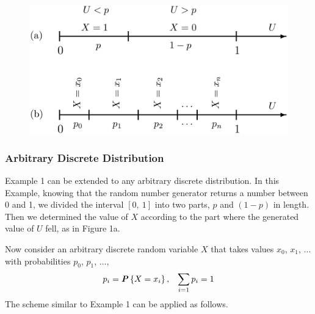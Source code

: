 \begin{figure}[H]
  \centering
  \includegraphics[width=\linewidth]{img/fig-5.2.png}
  \caption{}
\end{figure}

\subsubsection{Arbitrary Discrete Distribution}

Example 1 can be extended to any arbitrary discrete distribution. In this Example, knowing that the random number generator returns a number between 0 and 1, we divided the interval $\left[ 0,\ 1 \right]$ into two parts, $p$ and $(1 - p)$ in length. Then we determined the value of $X$ according to the part where the generated value of $U$ fell, as in Figure 1a.

Now consider an arbitrary discrete random variable $X$ that takes values $x_0$, $x_1$, $\ldots$ with probabilities $p_0$, $p_1$, $\ldots$,
\begin{align*}
  p_i = \textbf{\textit{P}}\left\{X = x_i\right\}, &&\sum_{i=1} p_i = 1
\end{align*}
The scheme similar to Example 1 can be applied as follows.

\vspace*{\fill}
\columnbreak


